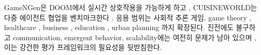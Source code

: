 
GameNGen은 DOOM에서 실시간 상호작용을 가능하게 하고 \citep{valeveski2024diffusion}, CUISINEWORLD는 다중 에이전트 협업을 벤치마크한다 \citep{gong2023mindagent}. 응용 범위는 사회적 추론 게임, game theory \citep{xu2023magic}, healthcare \citep{ke2024enhancing, kim2024adaptive}, business \citep{chen2024agentverse}, education \citep{gosling2024multi}, urban planning \citep{zhou2024largelanguagemodelparticipatory}까지 확장된다. 진전에도 불구하고 communication, emergent behavior, scalability에는 여전히 문제가 남아 있으며 \citep{agashe2024llmcoordinationevaluatinganalyzingmultiagent}, 이는 강건한 평가 프레임워크의 필요성을 뒷받침한다.

